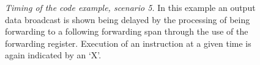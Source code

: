 \begin{figure}
\centering
{}
\caption{{\em Timing of the code example, scenario 5.}
In this example an output data broadcast is shown being
delayed by the processing of being forwarding
to a following forwarding span through the use
of the forwarding register.
Execution of an instruction at a given time is
again indicated by an `X'.}
\label{ex5}
\end{figure}




